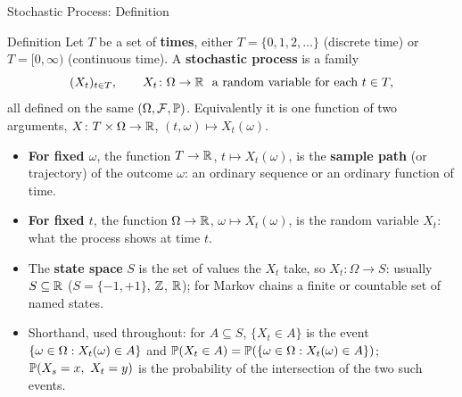 \begin{frame}{Stochastic Process: Definition}
  \label{fr:procdef}
  \small
  \begin{block}{Definition}
    Let $T$ be a set of \textbf{times}, either $T=\{0,1,2,\dots\}$ (discrete time) or $T=[0,\infty)$ (continuous time). A \textbf{stochastic process} is a family
    \[
      (X_t)_{t\in T},\qquad X_t\colon\Omega\to\R\ \text{ a random variable for each } t\in T,
    \]
    all defined on the same $(\Omega,\mathcal{F},\mathbb{P})$. Equivalently it is one function of two arguments, $X\colon T\times\Omega\to\mathbb{R}$, $(t,\omega)\mapsto X_t(\omega)$.
  \end{block}
  \begin{itemize}
    \item \textbf{For fixed $\omega$}, the function $T\to\mathbb{R}$, $t\mapsto X_t(\omega)$, is the \textbf{sample path} (or trajectory) of the outcome $\omega$: an ordinary sequence or an ordinary function of time.
    \item \textbf{For fixed $t$}, the function $\Omega\to\mathbb{R}$, $\omega\mapsto X_t(\omega)$, is the random variable $X_t$: what the process shows at time $t$.
    \item The \textbf{state space} $S$ is the set of values the $X_t$ take, so $X_t\colon\Omega\to S$: usually $S\subseteq\mathbb{R}$ ($S=\{-1,+1\}$, $\mathbb{Z}$, $\mathbb{R}$); for Markov chains a finite or countable set of named states.
    \item Shorthand, used throughout: for $A\subseteq S$, $\{X_t\in A\}$ is the event $\{\omega\in\Omega : X_t(\omega)\in A\}$ and $\mathbb{P}(X_t\in A)=\mathbb{P}(\{\omega\in\Omega : X_t(\omega)\in A\})$; $\mathbb{P}(X_s=x,\ X_t=y)$ is the probability of the intersection of the two such events.
  \end{itemize}
\end{frame}

